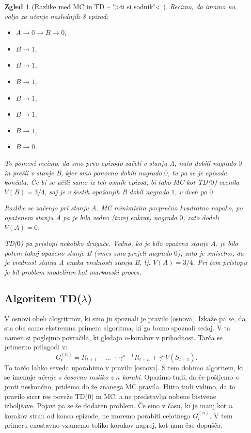 \documentclass[12pt,a4paper]{amsart}
\theoremstyle{definition} %
\theoremstyle{plain} %
\newtheorem{zgled}[definicija]{Zgled}
\begin{document}
\begin{zgled}[Razlike med MC in TD -- ">ti si sodnik"< \cite{RLintro}]
    Recimo, da imamo na voljo za učenje naslednjih 8 epizod:

    \begin{multicols}{2}
    \begin{itemize}
        \item $A \rightarrow 0 \rightarrow B \rightarrow 0$,
        \item $B \rightarrow 1$,
        \item $B \rightarrow 1$,
        \item $B \rightarrow 1$,
        \item $B \rightarrow 1$,
        \item $B \rightarrow 1$,
        \item $B \rightarrow 1$,
        \item $B \rightarrow 0$.
    \end{itemize}
    \end{multicols}

    To pomeni recimo, da smo prvo epizodo začeli v stanju A, nato dobili nagrado $0$ in prešli v 
    stanje B, kjer smo ponovno dobili nagrado $0$, tu pa se je epizoda končala. Če bi se učili 
    samo iz teh osmih epizod, bi tako MC kot TD($0$) ocenila $V(B) = 3/4$, saj je v šestih
    opažanjih B dobil nagrado $1$, v dveh pa $0$.

    Razlike se začenjo pri stanju A. MC minimizira povprečno kvadratno napako, po opaženem stanju 
    A pa je bila vedno (torej enkrat) nagrada $0$, zato dodeli $V(A) = 0$.

    TD($0$) pa pristopi nekoliko drugače. Vedno, ko je bilo opaženo stanje A, je bilo potem takoj 
    opaženo stanje B (vmes smo prejeli nagrado $0$), zato je smiselno, da je vrednost stanja A 
    enaka vrednosti stanja B, tj. $V(A) = 3/4$. Pri tem pristopu je bil problem modeliran kot 
    markovski proces.
\end{zgled}

\subsection{Algoritem TD($\lambda$)}
V osnovi obeh alogritmov, ki smo ju spoznali je pravilo \eqref{osnova}. Izkaže pa se, da sta oba 
samo ekstremna primera algoritma, ki ga bomo spoznali sedaj. V ta namen si poglejmo povračila, 
ki gledajo $n$-korakov v prihodnost. Tarča se primerno prilagodi v: 
$$
G_t^{(n)} = R_{t+1} + \dots + \gamma^{n-1} R_{t+n} + \gamma^n V(S_{t+1}).
$$
To tarčo lahko seveda uporabimo v pravilu \eqref{osnova}. S tem dobimo algoritem, ki se imenuje 
\textit{učenje s časovno razliko z $n$ koraki}. Opazimo tudi, da če pošljemo $n$ proti neskončno, 
pridemo do že znanega MC pravila. Hitro tudi vidimo, da to pravilo sicer res poveže TD($0$) in 
MC, a ne predstavlja nobene bistvene izboljšave. Pojavi pa se še dodaten problem. Če smo v času, ki
je manj kot $n$ korakov stran od konca epizode, ne moremo porabiti celotnega $G_t^{(n)}$. V tem 
primeru enostavno vzamemo toliko korakov naprej, kot nam čas dopušča. 
\end{document}
